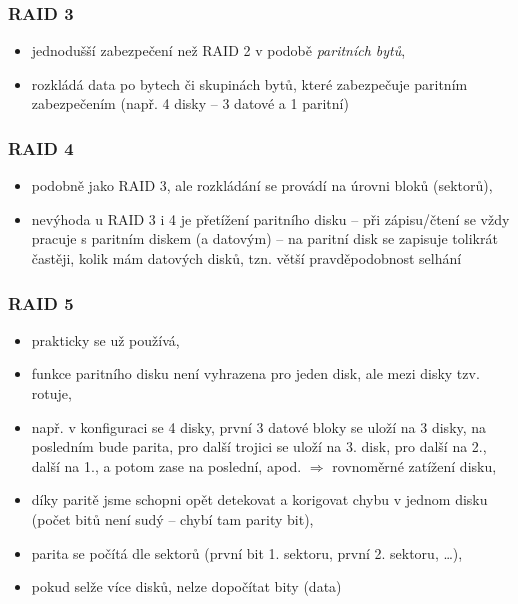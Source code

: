 \documentclass[a4paper, 11pt]{article}
\begin{document}
\newpage

\subsubsection{RAID 3}
\begin{itemize}
    \item jednodušší zabezpečení než RAID 2 v podobě \emph{paritních bytů},
    \item rozkládá data po bytech či skupinách bytů, které zabezpečuje paritním zabezpečením (např. 4 disky -- 3 datové a 1 paritní)
\end{itemize}
 
\subsubsection{RAID 4}
\begin{itemize}
    \item podobně jako RAID 3, ale rozkládání se provádí na úrovni bloků (sektorů),
    \item nevýhoda u RAID 3 i 4 je přetížení paritního disku -- při zápisu/čtení se vždy pracuje s paritním diskem (a datovým) -- na paritní disk se zapisuje tolikrát častěji, kolik mám datových disků, tzn. větší pravděpodobnost selhání
\end{itemize}
 
\subsubsection{RAID 5}
\begin{itemize}
    \item prakticky se už používá,
    \item funkce paritního disku není vyhrazena pro jeden disk, ale mezi disky tzv. rotuje,
    \item např. v konfiguraci se 4 disky, první 3 datové bloky se uloží na 3 disky, na posledním bude parita, pro další trojici se uloží na 3. disk, pro další na 2., další na 1., a potom zase na poslední, apod. $\Rightarrow$ rovnoměrné zatížení disku,
    \item díky paritě jsme schopni opět detekovat a korigovat chybu v jednom disku (počet bitů není sudý -- chybí tam parity bit),
    \item parita se počítá dle sektorů (první bit 1. sektoru, první 2. sektoru, \ldots),
    \item pokud selže více disků, nelze dopočítat bity (data)
\end{itemize}
 
\end{document}
